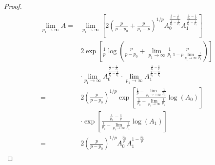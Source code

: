 \begin{proof}
	\begin{gather*}
		\begin{aligned}
			\lim\limits_{p_1 \rightarrow \infty} A =& \lim\limits_{p_1 \rightarrow \infty}	\left[2\left( \frac{p}{p - p_0} + \frac{p}{p_1 - p} \right)^{1/p}A_0^{\frac{\frac{1}{p} - \frac{1}{p_1}}{\frac{1}{p_0}-\frac{1}{p_1}}}A_1^{\frac{\frac{1}{p_0}-\frac{1}{p}}{\frac{1}{p_0}-\frac{1}{p_1}}}\right]\\
			=& 2\exp\left[ \frac{1}{p} \log\left(\frac{p}{p - p_0} + \lim\limits_{p_1 \rightarrow \infty} \frac{1}{p_1}\frac{p}{1 - p\lim\limits_{p_1 \rightarrow \infty}\frac{1}{p_1}}\right)\right]\\
			& \cdot \lim\limits_{p_1 \rightarrow \infty}A_0^{\frac{\frac{1}{p} - \frac{1}{p_1}}{\frac{1}{p_0}-\frac{1}{p_1}}}\cdot\lim\limits_{p_1 \rightarrow \infty}A_1^{\frac{\frac{1}{p_0}-\frac{1}{p}}{\frac{1}{p_0}-\frac{1}{p_1}}}\\
		=& 2\left( \frac{p}{p - p_0} \right)^{1/p} \exp\left[\displaystyle\frac{\frac{1}{p} - \lim\limits_{p_1 \rightarrow + \infty}\frac{1}{p_1}}{\frac{1}{p_0}-\lim\limits_{p_1 \rightarrow \infty}\frac{1}{p_1}}\log(A_0)\right]\\
		& \cdot \exp\left[\frac{\frac{1}{p_0}-\frac{1}{p}}{\frac{1}{p_0}-\lim\limits_{p_1 \rightarrow \infty}\frac{1}{p_1}}\log(A_1)\right]\\
		=& 2\left( \frac{p}{p - p_0} \right)^{1/p} A_0^{\frac{p_0}{p}} A_1^{1 - \frac{p_0}{p}}
		\end{aligned}
	\end{gather*}
\end{proof}
